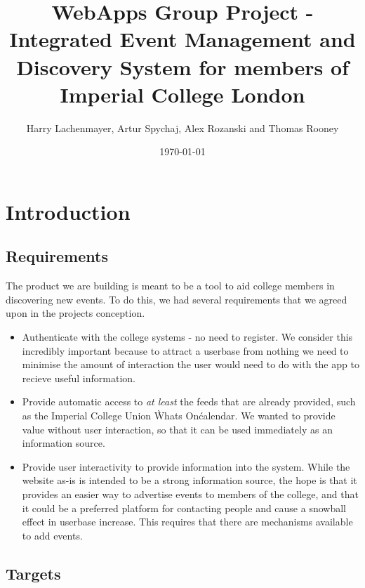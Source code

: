 \documentclass[a4wide, 11pt]{article}
\begin{document}
\title{WebApps Group Project - Integrated Event Management and Discovery System for members of Imperial College London}

\author{Harry Lachenmayer, Artur Spychaj, Alex Rozanski and Thomas Rooney}

\date{\today}         %

\maketitle            %

\section {Introduction}

\subsection {Requirements}

The product we are building is meant to be a tool to aid college members in discovering new events. To do this, we had several requirements that we agreed upon in the projects conception.

\begin{itemize}
\item Authenticate with the college systems - no need to register. We consider this incredibly important because to attract a userbase from nothing we need to minimise the amount of interaction the user would need to do with the app to recieve useful information.
\item Provide automatic access to \textit{at least} the feeds that are already provided, such as the Imperial College Union \`Whats On\' calendar. We wanted to provide value without user interaction, so that it can be used immediately as an information source.
\item Provide user interactivity to provide information into the system. While the website as-is is intended to be a strong information source, the hope is that it provides an easier way to advertise events to members of the college, and that it could be a preferred platform for contacting people and cause a snowball effect in userbase increase. This requires that there are mechanisms available to add events.
\end{itemize}

\subsection {Targets}
\end{document}
